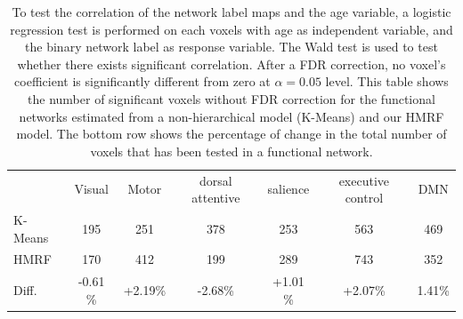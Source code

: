 \documentclass[review,authoryear]{elsarticle}
\begin{document}
\begin{table}
\centering
\begin{tabular}{lcccccc}
\toprule
& Visual & Motor & dorsal attentive & salience & executive control & DMN \\
\cline{2-7}
K-Means & 195  & 251 & 378 &  253 & 563 & 469\\
\cline{2-7}
HMRF & 170 &  412 & 199 & 289 & 743 & 352 \\
\cline{2-7}
 Diff. &  -0.61 \%  & +2.19\%  & -2.68\%        &  +1.01 \%& +2.07\% &  1.41\%  \\

\bottomrule
\end{tabular}
\caption{To test the correlation of the network label maps and the age variable,
  a logistic regression test is performed on each voxels with age as independent
  variable, and the binary network label as response variable. The Wald test is
  used to test whether there exists significant correlation. After a FDR
  correction, no voxel's coefficient is significantly different from zero at
  $\alpha = 0.05$ level. This table shows the number of significant voxels
  without FDR correction for the functional networks estimated from a
  non-hierarchical model (K-Means) and our HMRF model. The bottom row shows the
  percentage of change in the total number of voxels that has been tested in a
  functional network. }
\end{table}
\end{document}
